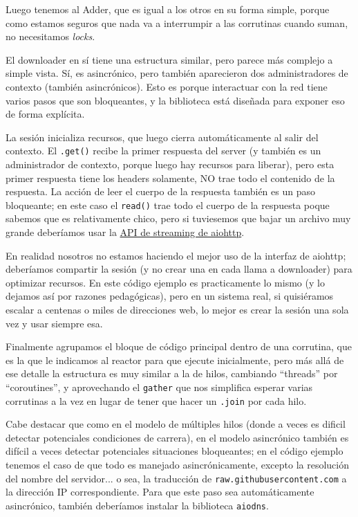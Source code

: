 Luego tenemos al Adder, que es igual a los otros en su forma simple, porque como estamos seguros que nada va a interrumpir a las corrutinas cuando suman, no necesitamos \textit{locks}.

El downloader en sí tiene una estructura similar, pero parece más complejo a simple vista. Sí, es asincrónico, pero también aparecieron dos administradores de contexto (también asincrónicos). Esto es porque interactuar con la red tiene varios pasos que son bloqueantes, y la biblioteca está diseñada para exponer eso de forma explícita.

La sesión inicializa recursos, que luego cierra automáticamente al salir del contexto. El \texttt{.get()} recibe la primer respuesta del server (y también es un administrador de contexto, porque luego hay recursos para liberar), pero esta primer respuesta tiene los headers solamente, NO trae todo el contenido de la respuesta. La acción de leer el cuerpo de la respuesta también es un paso bloqueante; en este caso el \texttt{read()} trae todo el cuerpo de la respuesta poque sabemos que es relativamente chico, pero si tuviesemos que bajar un archivo muy grande deberíamos usar la \href{https://docs.aiohttp.org/en/stable/streams.html}{API de streaming de aiohttp}.

En realidad nosotros no estamos haciendo el mejor uso de la interfaz de aiohttp; deberíamos compartir la sesión (y no crear una en cada llama a downloader) para optimizar recursos. En este código ejemplo es practicamente lo mismo (y lo dejamos así por razones pedagógicas), pero en un sistema real, si quisiéramos escalar a centenas o miles de direcciones web, lo mejor es crear la sesión una sola vez y usar siempre esa.

Finalmente agrupamos el bloque de código principal dentro de una corrutina, que es la que le indicamos al reactor para que ejecute inicialmente, pero más allá de ese detalle la estructura es muy similar a la de hilos, cambiando ``threads'' por ``coroutines'', y aprovechando el \texttt{gather} que nos simplifica esperar varias corrutinas a la vez en lugar de tener que hacer un \texttt{.join} por cada hilo.

Cabe destacar que como en el modelo de múltiples hilos (donde a veces es dificil detectar potenciales condiciones de carrera), en el modelo asincrónico también es difícil a veces detectar potenciales situaciones bloqueantes; en el código ejemplo tenemos el caso de que todo es manejado asincrónicamente, excepto la resolución del nombre del servidor... o sea, la traducción de \texttt{raw.githubusercontent.com} a la dirección IP correspondiente. Para que este paso sea automáticamente asincrónico, también deberíamos instalar la biblioteca \texttt{aiodns}.


